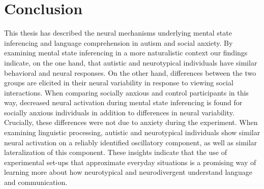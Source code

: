 \section{Conclusion}

This thesis has described the neural mechanisms underlying mental state inferencing and language comprehension in autism and social anxiety. By examining mental state inferencing in a more naturalistic context our findings indicate, on the one hand, that autistic and neurotypical individuals have similar behavioral and neural responses. On the other hand, differences between the two groups are elicited in their neural variability in response to viewing social interactions. When comparing socially anxious and control participants in this way, decreased neural activation during mental state inferencing is found for socially anxious individuals in addition to differences in neural variability. Crucially, these differences were not due to anxiety during the experiment. When examining linguistic processing, autistic and neurotypical individuals show similar neural activation on a reliably identified oscillatory component, as well as similar lateralization of this component. These insights indicate that the use of experimental set-ups that approximate everyday situations is a promising way of learning more about how neurotypical and neurodivergent understand language and communication. 